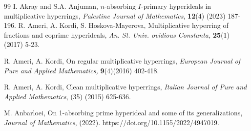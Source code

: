 \documentclass[preprint,review,10pt]{amsart}
\theoremstyle{definition}
\theoremstyle{remark}
\numberwithin{equation}{section}
\begin{document}
\begin{thebibliography}{99}
I. Akray and S.A. Anjuman, $n$-absorbing $I$-primary hyperideals in  multiplicative hyperrings, {\it Palestine Journal of Mathematics}, {\bf 12}(4) (2023) 187-196.
R. Ameri, A. Kordi, S. Hoskova-Mayerova, Multiplicative hyperring of fractions and coprime hyperideals, {\it An. St. Univ. ovidious Constanta,}  {\bf 25}(1) (2017)   5-23.




R. Ameri, A. Kordi, On regular multiplicative hyperrings, {\it European Journal of Pure and Applied  Mathematics,} {\bf 9}(4)(2016) 402-418.

R. Ameri, A. Kordi, Clean multiplicative hyperrings, {\it Italian Journal of Pure and Applied Mathematics}, (35) (2015) 625-636. 





M. Anbarloei, On 1-absorbing prime hyperideal and some of
its generalizations, {\it Journal of Mathematics}, (2022). https://doi.org/10.1155/2022/4947019.







\end{thebibliography}
\end{document}

